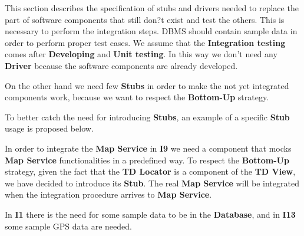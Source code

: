 This section describes the specification of stubs and drivers needed to replace the part of software components that still don?t exist and test the others. This is necessary to perform the integration steps. DBMS should contain sample data in order to perform proper test cases. We assume that the \textbf{Integration testing} comes after \textbf{Developing} and \textbf{Unit testing}. In this way we don't need any \textbf{Driver} because the software components are already developed.\par
On the other hand we need few \textbf{Stubs} in order to make the not yet integrated components work, because we want to respect the \textbf{Bottom-Up} strategy.\par
To better catch the need for introducing \textbf{Stubs}, an example of a specific \textbf{Stub} usage is proposed below.\par
In order to integrate the \textbf{Map Service} in \textbf{I9} we need a component that mocks \textbf{Map Service} functionalities in a predefined way. 
To respect the \textbf{Bottom-Up} strategy, given the fact that the \textbf{TD Locator} is a component of the \textbf{TD View}, we have decided to introduce its \textbf{Stub}.
The real \textbf{Map Service} will be integrated when the integration procedure arrives to \textbf{Map Service}.\par
In \textbf{I1} there is the need for some sample data to be in the \textbf{Database}, and in \textbf{I13} some sample GPS data are needed.
